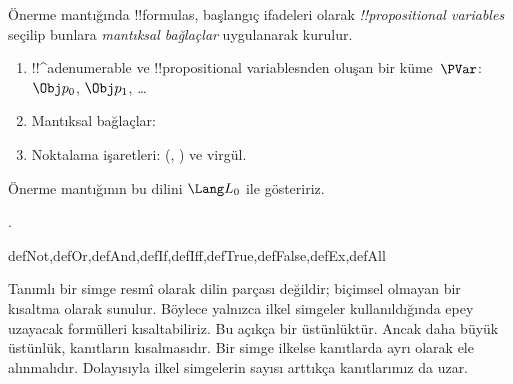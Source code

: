 \documentclass[../../../include/open-logic-section]{subfiles}
\begin{document}


Önerme mantığında !!{formula}s, başlangıç ifadeleri olarak
\emph{!!{propositional variable}s} seçilip bunlara \emph{mantıksal bağlaçlar}
uygulanarak kurulur.

\begin{enumerate}
\item !!^a{denumerable} ve !!{propositional variable}s{}nden oluşan bir
  küme~$\PVar$:
  $\Obj p_0$, $\Obj p_1$, \dots
{}
\item Mantıksal bağlaçlar:
  \startycommalist
\item Noktalama işaretleri: (, ) ve virgül.
\end{enumerate}

Önerme mantığının bu dilini $\Lang L_0$ ile gösteririz.

.

\begin{tagblock}{defNot,defOr,defAnd,defIf,defIff,defTrue,defFalse,defEx,defAll}
\begin{explain}
Tanımlı bir simge resmî olarak dilin parçası değildir; biçimsel olmayan bir
kısaltma olarak sunulur. Böylece yalnızca ilkel simgeler kullanıldığında epey
uzayacak formülleri kısaltabiliriz. Bu açıkça bir üstünlüktür. Ancak daha
büyük üstünlük, kanıtların kısalmasıdır. Bir simge ilkelse kanıtlarda ayrı
olarak ele alınmalıdır. Dolayısıyla ilkel simgelerin sayısı arttıkça
kanıtlarımız da uzar.
\end{explain}
\end{tagblock}
\end{document}
